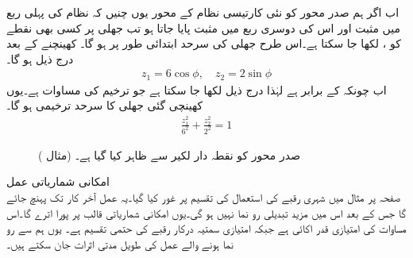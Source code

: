اب اگر ہم صدر محور کو نئی کارتیسی نظام  کے محور یوں چنیں کہ  نظام کی پہلی ربع میں مثبت  اور اس کی دوسری ربع میں مثبت  پایا جاتا ہو تب جھلی پر کسی بھی نقطے کو ،  لکھا جا سکتا ہے۔اس طرح جھلی کی سرحد ابتدائی طور پر  ہو گا۔ کھینچنے کے بعد درج ذیل ہو گا۔
\begin{align*}
z_1=6\cos \phi,\quad z_2=2\sin \phi
\end{align*} 
اب چونکہ  کے برابر ہے لہٰذا درج ذیل لکھا جا سکتا ہے جو ترخیم کی مساوات ہے۔یوں کھینچی گئی جھلی کا سرحد ترخیمی ہو گا۔
\begin{align*}
\frac{z_1^2}{6^2}+\frac{z_2^2}{2^2}=1
\end{align*}
%
\begin{figure}
\centering
{}
\caption{صدر محور کو نقطہ دار لکیر سے ظاہر کیا گیا ہے۔ (مثال )}
\label{شکل_مثال_امتیازی_جھلی_صدر_محور}
\end{figure}
\quad امکانی شماریاتی عمل\\
صفحہ  پر مثال  میں  شہری رقبے کی استعمال کی تقسیم پر غور کیا گیا۔یہ عمل آخر کار   تک پہنچ جائے گا جس کے بعد اس میں مزید تبدیلی رو نما نہیں ہو گی۔یوں امکانی شماریاتی قالب  پر پورا اترے گا۔اس مساوات کی امتیازی قدر اکائی ہے جبکہ امتیازی سمتیہ  درکار رقبے کی حتمی تقسیم ہے۔ یوں ہم   سے رو نما ہونے والے عمل کی طویل مدتی اثرات جان سکتے ہیں۔ 

